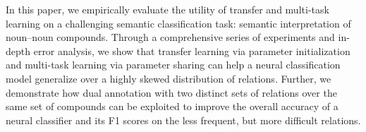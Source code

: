 In this paper, we empirically evaluate the utility of transfer and multi-task learning on a challenging semantic classification task: semantic interpretation of noun--noun compounds. Through a comprehensive series of experiments and in-depth error analysis, we show that transfer learning via parameter initialization and multi-task learning via parameter sharing can help a neural classification model generalize over a highly skewed distribution of relations. Further, we demonstrate how dual annotation with two distinct sets of relations over the same set of compounds can be exploited to improve the overall accuracy of a neural classifier and its F1 scores on the less frequent, but more difficult relations.
